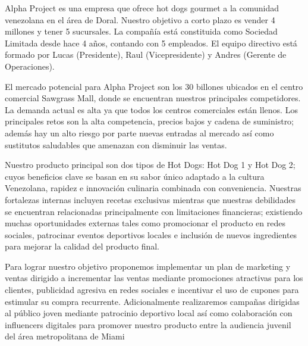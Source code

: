 

Alpha Project es una empresa que ofrece hot dogs gourmet a la comunidad venezolana en el área de Doral. Nuestro objetivo a corto plazo es vender 4 millones y tener 5 sucursales. La compañía está constituida como Sociedad Limitada desde hace 4 años, contando con 5 empleados. El equipo directivo está formado por Lucas (Presidente), Raul (Vicepresidente) y Andres (Gerente de Operaciones). 

El mercado potencial para Alpha Project son los 30 billones ubicados en el centro comercial Sawgrass Mall, donde se encuentran nuestros principales competidores. La demanda actual es alta ya que todos los centros comerciales están llenos. Los principales retos son la alta competencia, precios bajos y cadena de suministro; además hay un alto riesgo por parte nuevas entradas al mercado así como sustitutos saludables que amenazan con disminuir las ventas. 

Nuestro producto principal son dos tipos de Hot Dogs: Hot Dog 1 y Hot Dog 2; cuyos beneficios clave se basan en su sabor único adaptado a la cultura Venezolana, rapidez e innovación culinaria combinada con conveniencia. Nuestras fortalezas internas incluyen recetas exclusivas mientras que nuestras debilidades se encuentran relacionadas principalmente con limitaciones financieras; existiendo muchas oportunidades externas tales como promocionar el producto en redes sociales, patrocinar eventos deportivos locales e inclusión de nuevos ingredientes para mejorar la calidad del producto final. 

Para lograr nuestro objetivo proponemos implementar un plan de marketing y ventas dirigido a incrementar las ventas mediante promociones atractivas para los clientes, publicidad agresiva en redes sociales e incentivar el uso de cupones para estimular su compra recurrente. Adicionalmente realizaremos campañas dirigidas al público joven mediante patrocinio deportivo local así como colaboración con influencers digitales para promover nuestro producto entre la audiencia juvenil del área metropolitana de Miami